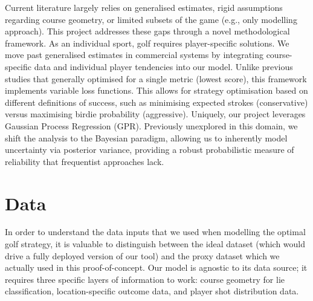 \documentclass[11pt, letterpaper]{article}
\begin{document}
Current literature largely relies on generalised estimates, rigid assumptions regarding course geometry, or limited subsets of the game (e.g., only modelling approach). This project addresses these gaps through a novel methodological framework. As an individual sport, golf requires player-specific solutions. We move past generalised estimates in commercial systems by integrating course-specific data and individual player tendencies into our model. Unlike previous studies that generally optimised for a single metric (lowest score), this framework implements variable loss functions. This allows for strategy optimisation based on different definitions of success, such as minimising expected strokes (conservative) versus maximising birdie probability (aggressive). Uniquely, our project leverages Gaussian Process Regression (GPR). Previously unexplored in this domain, we shift the analysis to the Bayesian paradigm, allowing us to inherently model uncertainty via posterior variance, providing a robust probabilistic measure of reliability that frequentist approaches lack.

\section{Data}
\label{sec:Data}

In order to understand the data inputs that we used when modelling the optimal golf strategy, it is valuable to distinguish between the ideal dataset (which would drive a fully deployed version of our tool) and the proxy dataset which we actually used in this proof-of-concept. Our model is agnostic to its data source; it requires three specific layers of information to work: course geometry for lie classification, location-specific outcome data, and player shot distribution data.
\end{document}
